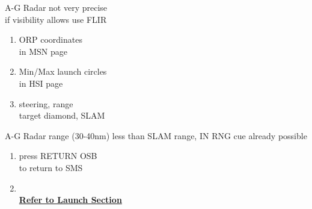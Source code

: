 \documentclass[fontInter, widesubsec]{TechCheck}
\begin{document}
	 A-G Radar not very precise \\
	if visibility allows use FLIR
	\begin{enumerate}[resume]
		\item {}\dotfill ORP coordinates\\
		\hfill  in MSN page
		\item {}\dotfill Min/Max launch circles\\
		\hfill in HSI page
		\item {}\dotfill steering, range \\
		\hfill  target diamond, SLAM
	\end{enumerate}
	 A-G Radar range (30-40nm) less than SLAM range, IN RNG cue already possible
	\begin{enumerate}[resume]
		\item {}\dotfill press RETURN OSB \\
		\hfill to return to SMS
		\item {} \\
		\hfill \hyperref[subsec:84launch]{\textbf{Refer to Launch Section}}
	\end{enumerate}
\end{document}

